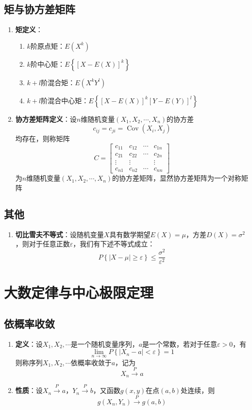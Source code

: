 \documentclass[12pt,a4paper,UTF8]{book}
\begin{document}
\subsection{矩与协方差矩阵}
\begin{enumerate}
\item \textbf{矩定义}：
\begin{enumerate}
\item $k$阶原点矩：$E\left(X^k\right)$
\item $k$阶中心矩：$E\left\{\left[X-E\left(X\right)\right]^k\right\}$
\item $k+l$阶混合矩：$E\left(X^kY^l\right)$
\item $k+l$阶混合中心矩：$E\left\{\left[X-E\left(X\right)\right]^k\left[Y-E\left(Y\right)\right]^l\right\}$
\end{enumerate}
\item \textbf{协方差矩阵定义}：设$n$维随机变量$\left(X_1,X_2,\cdots,X_n\right)$的协方差
\[c_{ij}=c_{ji}=\operatorname{Cov}\left(X_i,X_j\right)\]
均存在，则称矩阵
\[C=\begin{bmatrix}c_{11}&c_{12}&\cdots&c_{1n}\\c_{21}&c_{22}&\cdots&c_{2n}\\\vdots&\vdots&\ &\vdots\\c_{n1}&c_{n2}&\cdots&c_{nn}\end{bmatrix}\]
为$n$维随机变量$\left(X_1,X_2,\cdots,X_n\right)$的协方差矩阵，显然协方差矩阵为一个对称矩阵
\end{enumerate}

\subsection{其他}
\begin{enumerate}
\item \textbf{切比雪夫不等式}：设随机变量$X$具有数学期望$E\left(X\right)=\mu$，方差$D\left(X\right)=\sigma^2$，则对于任意正数$\varepsilon$，我们有下述不等式成立：
\[P\left\{\left|X-\mu\right|\geq\varepsilon\right\}\leq\frac{\sigma^2}{\varepsilon^2}\]
\end{enumerate}


\section{大数定律与中心极限定理}
\subsection{依概率收敛}
\begin{enumerate}
\item \textbf{定义}：设$X_1,X_2,\cdots$是一个随机变量序列，$a$是一个常数，若对于任意$\varepsilon>0$，有
\[\lim\limits_{n\to\infty}P\left\{\left|X_n-a\right|<\varepsilon\right\}=1\]
则称序列$X_1,X_2,\cdots$依概率收敛于$a$，记为
\[X_n\xrightarrow{\ P\ }a\]
\item \textbf{性质}：设$X_n\xrightarrow{\ P\ }a$，$Y_n\xrightarrow{\ P\ }b$，又函数$g\left(x,y\right)$在点$\left(a,b\right)$处连续，则
\[g\left(X_n,Y_n\right)\xrightarrow{\ P\ }g\left(a,b\right)\]
\end{enumerate}
\end{document}

